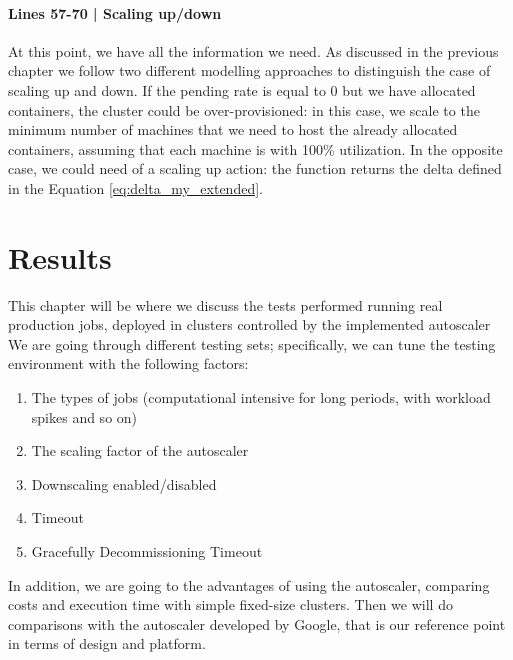 \documentclass[12pt,twoside,cucitura]{toptesi}
\begin{document}
\subsubsection{Lines 57-70 | Scaling up/down}
At this point, we have all the information we need. As discussed in the previous chapter we follow two different modelling approaches to distinguish the case of scaling up and down. If the pending rate is equal to 0 but we have allocated containers, the cluster could be over-provisioned: in this case, we scale to the minimum number of machines that we need to host the already allocated containers, assuming that each machine is with 100\% utilization. In the opposite case, we could need of a scaling up action: the function returns the delta defined in the Equation \ref{eq:delta_my_extended}.

\chapter{Results}
This chapter will be where we discuss the tests performed running real production jobs, deployed in clusters controlled by the implemented autoscaler We are going through different testing sets; specifically, we can tune the testing environment with the following factors:
\begin{enumerate}
	\item The types of jobs (computational intensive for long periods, with workload spikes and so on)
	\item The scaling factor of the autoscaler
	\item Downscaling enabled/disabled
	\item Timeout
	\item Gracefully Decommissioning Timeout
\end{enumerate}

In addition, we are going to the advantages of using the autoscaler, comparing costs and execution time with simple fixed-size clusters. Then we will do comparisons with the autoscaler developed by Google, that is our reference point in terms of design and platform.
\end{document}
